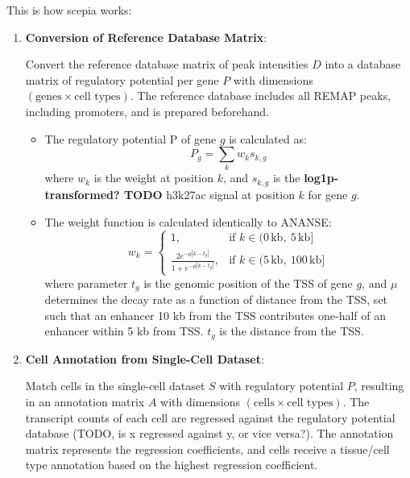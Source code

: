 
\noindent
This is how scepia works:

\begin{enumerate}
    \item \textbf{Conversion of Reference Database Matrix}:
    
    Convert the reference database matrix of peak intensities $D$ into a database matrix of regulatory potential per gene $P$ with dimensions $(\text{genes} \times \text{cell types})$. The reference database includes all REMAP peaks, including promoters, and is prepared beforehand.
    
    \begin{itemize}
        \item The regulatory potential P of gene $g$ is calculated as:
        \begin{equation*}
            P_g = \sum_k w_{k}s_{k,g}
        \end{equation*}
        where $w_k$ is the weight at position $k$, and $s_{k,g}$ is the \textbf{log1p-transformed? TODO} h3k27ac signal at position $k$ for gene $g$.
        
        \item The weight function is calculated identically to ANANSE:
        \begin{equation*}
            w_k = \begin{cases}
                1, & \text{if } k \in (0\,\text{kb},\ 5\,\text{kb}] \\
                \frac{2e^{-\mu|k-t_g|}}{1+e^{-\mu|k-t_g|}}, & \text{if } k \in (5\,\text{kb},\ 100\,\text{kb}]
            \end{cases}
        \end{equation*}
        where parameter $t_g$ is the genomic position of the TSS of gene $g$, and $\mu$ determines the decay rate as a function of distance from the TSS, set such that an enhancer 10 kb from the TSS contributes one-half of an enhancer within 5 kb from TSS. $t_g$ is the distance from the TSS.
    \end{itemize}

    \item \textbf{Cell Annotation from Single-Cell Dataset}:
    
    Match cells in the single-cell dataset $S$ with regulatory potential $P$, resulting in an annotation matrix $A$ with dimensions $(\text{cells} \times \text{cell types})$. The transcript counts of each cell are regressed against the regulatory potential database (TODO, is x regressed against y, or vice versa?). The annotation matrix represents the regression coefficients, and cells receive a tissue/cell type annotation based on the highest regression coefficient.
    

\end{enumerate}
